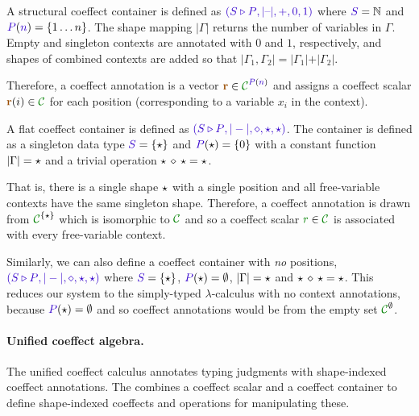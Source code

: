 \begin{example}
\label{ex:further-struct-shape}
A structural coeffect container is defined as $\sclrd{(\SHP, {|}\textnormal{--}{|}, +, 0, 1)}$
where $\SH=\mathbb{N}$ and $\SP(\sclrd{n})=\{ 1 \ldots n \}$. The shape mapping ${|}\Gamma{|}$ returns the
number of variables in $\Gamma$. Empty and singleton contexts are annotated with $0$ and $1$,
respectively, and shapes of combined contexts are added so that ${|}\Gamma_1, \Gamma_2{|} =
{|}\Gamma_1{|} + {|}\Gamma_2{|}$.

Therefore, a coeffect annotation is a vector
$\aclrd{\textbf{r}} \in \C^{\SP(\sclrd{n})}$ and assigns a coeffect scalar $\aclrd{\textbf{r}}(i) \in \C$
for each position (corresponding to a variable $x_i$ in the context).
\end{example}

\begin{example}
\label{ex:further-flat-shape}
A flat coeffect container is defined as $\sclrd{(\SHP, {|}-{|}, \diamond, \sflat, \sflat)}$.
The container is defined as a singleton data type $\SH = \{\sflat \}$ and $\SP(\sflat) = \{ 0 \}$
with a constant function ${|}\Gamma{|}=\star$ and a trivial operation $\star\,\diamond\,\star = \star$.

That is, there is a single shape
$\star$ with a single position and all free-variable contexts have the same singleton shape.
Therefore, a coeffect annotation is drawn from $\C^{\{\sflat\}}$ which is isomorphic to $\C$
and so a coeffect scalar $\cclrd{r}\in \C$ is associated with every free-variable context.
\end{example}

\begin{example}
Similarly, we can also define a coeffect container with \emph{no} positions,
\ie~$\sclrd{(\SHP, {|}-{|}, \diamond, \sflat, \sflat)}$ where $\SH = \{\sflat \}$, $\SP(\sflat) = \emptyset$,
${|}\Gamma{|}=\star$ and $\star\,\diamond\,\star = \star$.
This reduces our system to the simply-typed $\lambda$-calculus with no context annotations, because
$\SP(\sflat)=\emptyset$ and so coeffect annotations would be from the empty set $\C^\emptyset$.
\end{example}


\paragraph{Unified coeffect algebra.}
The unified coeffect calculus annotates typing judgments with shape-indexed coeffect annotations.
The \emph{} combines a coeffect scalar and a coeffect container
to define shape-indexed coeffects and operations for manipulating these.

